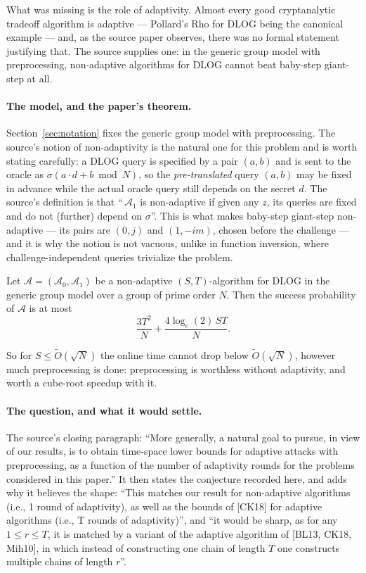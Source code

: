 \documentclass{aicr-conjecture}
\newcommand{\Adv}{\mathcal{A}}
\newcommand{\Ot}{\widetilde{O}}
\begin{document}
What was missing is the role of adaptivity. Almost every good
cryptanalytic tradeoff algorithm is adaptive --- Pollard's Rho for
DLOG being the canonical example --- and, as the source paper observes,
there was no formal statement justifying that. The source supplies one:
in the generic group model with preprocessing, non-adaptive algorithms
for DLOG cannot beat baby-step giant-step at all.

\paragraph{The model, and the paper's theorem.}
Section~\ref{sec:notation} fixes the generic group model with
preprocessing. The source's notion of non-adaptivity is the natural one
for this problem and is worth stating carefully: a DLOG query is
specified by a pair $(a,b)$ and is sent to the oracle as
$\sigma(a \cdot d + b \bmod N)$, so the \emph{pre-translated} query
$(a,b)$ may be fixed in advance while the actual oracle query still
depends on the secret $d$. The source's definition is that
``\,$\Adv_{1}$ is non-adaptive if given any $z$, its queries are fixed
and do not (further) depend on $\sigma$''. This is what makes baby-step
giant-step non-adaptive --- its pairs are $(0, j)$ and $(1, -im)$,
chosen before the challenge --- and it is why the notion is not
vacuous, unlike in function inversion, where challenge-independent
queries trivialize the problem.

\begin{theorem}[The source's Theorem 1.1, the $r = 1$ case]\label{thm:one}
Let $\Adv = (\Adv_{0}, \Adv_{1})$ be a non-adaptive $(S,T)$-algorithm
for DLOG in the generic group model over a group of prime order $N$.
Then the success probability of $\Adv$ is at most
\[
  \frac{3T^{2}}{N} + \frac{4 \log_{e}(2) \, ST}{N}.
\]
\end{theorem}

So for $S \le \Ot(\sqrt{N})$ the online time cannot drop below
$\Ot(\sqrt{N})$, however much preprocessing is done: preprocessing is
worthless without adaptivity, and worth a cube-root speedup with it.

\paragraph{The question, and what it would settle.}
The source's closing paragraph: ``More generally, a natural goal to
pursue, in view of our results, is to obtain time-space lower bounds for
adaptive attacks with preprocessing, as a function of the number of
adaptivity rounds for the problems considered in this paper.'' It then
states the conjecture recorded here, and adds why it believes the shape:
``This matches our result for non-adaptive algorithms (i.e., 1 round of
adaptivity), as well as the bounds of [CK18] for adaptive algorithms
(i.e., T rounds of adaptivity)'', and ``it would be sharp, as for any
$1 \le r \le T$, it is matched by a variant of the adaptive algorithm
of [BL13, CK18, Mih10], in which instead of constructing one chain of
length $T$ one constructs multiple chains of length $r$''.
\end{document}
